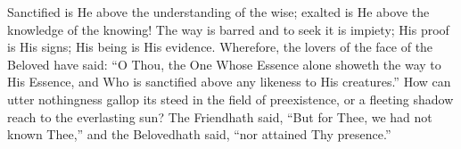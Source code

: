 \documentclass[12pt]{article}
\begin{document}
\vspace{2ex}
 {
Sanctified is He above the understanding of the wise; exalted is He above the knowledge of the knowing!
}
\vspace{2ex}
 {
The way is barred and to seek it is impiety;
}
\vspace{2ex}
 {
His proof is His signs; His being is His evidence.\footnotemark[4]
}
\vspace{2ex}
 {
Wherefore, the lovers of the face of the Beloved have said: ``O Thou, the One Whose Essence alone showeth the way to His Essence, and Who is sanctified above any likeness to His creatures.''\footnotemark[30]
}
\vspace{2ex}
 {
How can utter nothingness gallop its steed in the field of preexistence, or a fleeting shadow reach to the everlasting sun?
}
\vspace{2ex}
 {
The Friend\footnotemark[32] hath said, ``But for Thee, we had not known Thee,''
}
\vspace{2ex}
 {
and the Beloved\footnotemark[32] hath said, ``nor attained Thy presence.''
}
\end{document}

